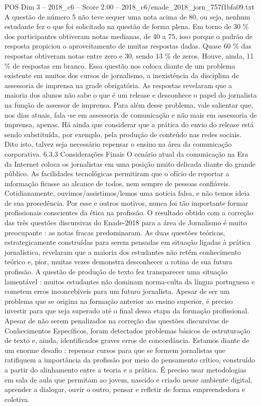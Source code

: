 \begin{textsample}{POS Dim 3 – 2018\_c6 – Score 2.00 – 2018\_c6/enade\_2018\_jorn\_757f1bfa09.txt}
A questão de número 5 não teve sequer uma nota acima de 80, ou seja, nenhum estudante fez o que foi solicitado na questão de forma plena.
Em torno de 30 \% dos participantes obtiveram notas medianas, de 40 a 75, isso porque o padrão de resposta propiciou o aproveitamento de muitas respostas dadas.
Quase 60 \% das respostas obtiveram notas entre zero e 30, sendo 13 \% de zeros.
Houve, ainda, 11 \% de respostas em branco.
Essa questão nos coloca diante de um problema existente em muitos dos cursos de jornalismo, a inexistência da disciplina de assessoria de imprensa na grade obrigatória.
As respostas revelaram que a maioria dos alunos não sabe o que é um release e desconhece o papel do jornalista na função de assessor de imprensa.
Para além desse problema, vale salientar que, nos dias atuais, fala -se em assessoria de comunicação e não mais em assessoria de imprensa, apenas.
Há ainda que considerar que a prática do envio do release está sendo substituída, por exemplo, pela produção de conteúdo nas redes sociais.
Dito isto, talvez seja necessário repensar o ensino na área da comunicação corporativa. 6.3.3 Considerações Finais O cenário atual da comunicação na Era da Internet coloca os jornalistas em uma posição muito delicada diante do grande público.
As facilidades tecnológicas permitiram que o ofício de reportar a informação ficasse ao alcance de todos, nem sempre de pessoas confiáveis.
Cotidianamente, ouvimos/assistimos/lemos uma notícia falsa, e não temos ideia de sua procedência.
Por esse e outros motivos, nunca foi tão importante formar profissionais conscientes da ética na profissão.
O resultado obtido com a correção das três questões discursivas do Enade-2018 para a área de Jornalismo é muito preocupante : as notas fracas predominaram.
As duas questões teóricas, estrategicamente construídas para serem pensadas em situação ligadas à prática jornalística, revelaram que a maioria dos estudantes não retém conhecimento teórico e, pior, muitas vezes demonstra desconhecer a rotina de sua futura profissão.
A questão de produção de texto fez transparecer uma situação lamentável : muitos estudantes não dominam norma-culta da língua portuguesa e cometem erros inconcebíveis para um futuro jornalista.
Apesar de ser um problema que se origina na formação anterior ao ensino superior, é preciso investir para que seja superado até o final dessa etapa da formação profissional.
Apesar de não serem penalizados na correção das questões discursivas de Conhecimentos Específicos, foram detectados problemas básicos de estruturação de texto e, ainda, identificados graves erros de concordância.
Estamos diante de um enorme desafio : repensar cursos para que se formem jornalistas que ratifiquem a importância da profissão por meio do pensamento crítico, construído a partir do alinhamento entre a teoria e a prática.
É preciso usar metodologias em sala de aula que permitam ao jovem, nascido e criado nesse ambiente digital, aprender a dialogar, ouvir o outro, pensar e refletir de forma empreendedora e coletiva.

\end{textsample}
